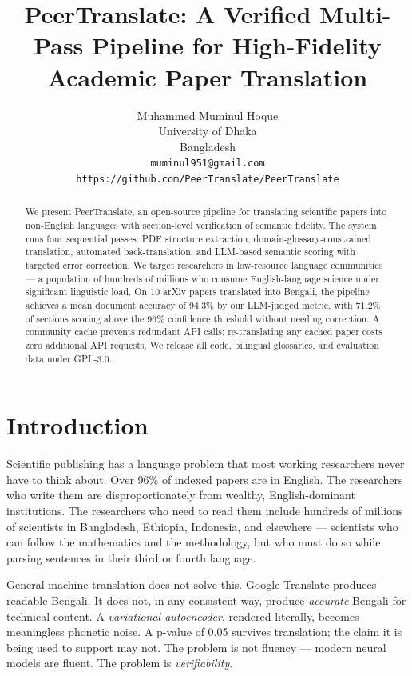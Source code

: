 \documentclass{article}
\title{PeerTranslate: A Verified Multi-Pass Pipeline for High-Fidelity Academic Paper Translation}
\author{%
  Muhammed Muminul Hoque\\
  University of Dhaka\\
  Bangladesh \\
  \texttt{muminul951@gmail.com} \\
  \texttt{https://github.com/PeerTranslate/PeerTranslate} \\
}
\begin{document}
\maketitle

\begin{abstract}
We present PeerTranslate, an open-source pipeline for translating scientific papers into non-English languages with section-level verification of semantic fidelity. The system runs four sequential passes: PDF structure extraction, domain-glossary-constrained translation, automated back-translation, and LLM-based semantic scoring with targeted error correction. We target researchers in low-resource language communities --- a population of hundreds of millions who consume English-language science under significant linguistic load. On 10 arXiv papers translated into Bengali, the pipeline achieves a mean document accuracy of 94.3\% by our LLM-judged metric, with 71.2\% of sections scoring above the 96\% confidence threshold without needing correction. A community cache prevents redundant API calls: re-translating any cached paper costs zero additional API requests. We release all code, bilingual glossaries, and evaluation data under GPL-3.0.
\end{abstract}

\section{Introduction}

Scientific publishing has a language problem that most working researchers never have to think about. Over 96\% of indexed papers are in English. The researchers who write them are disproportionately from wealthy, English-dominant institutions. The researchers who need to read them include hundreds of millions of scientists in Bangladesh, Ethiopia, Indonesia, and elsewhere --- scientists who can follow the mathematics and the methodology, but who must do so while parsing sentences in their third or fourth language.

General machine translation does not solve this. Google Translate produces readable Bengali. It does not, in any consistent way, produce \emph{accurate} Bengali for technical content. A \emph{variational autoencoder}, rendered literally, becomes meaningless phonetic noise. A p-value of 0.05 survives translation; the claim it is being used to support may not. The problem is not fluency --- modern neural models are fluent. The problem is \emph{verifiability}.
\end{document}
